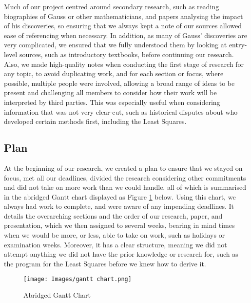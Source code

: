 \documentclass{article}
\begin{document}
Much of our project centred around secondary research, such as reading biographies of Gauss or other mathematicians, and papers analysing the impact of his discoveries, so ensuring that we always kept a note of our sources allowed ease of referencing when necessary. In addition, as many of Gauss’ discoveries are very complicated, we ensured that we fully understood them by looking at entry-level sources, such as introductory textbooks, before continuing our research. Also, we made high-quality notes when conducting the first stage of research for any topic, to avoid duplicating work, and for each section or focus, where possible, multiple people were involved, allowing a broad range of ideas to be present and challenging all members to consider how their work will be interpreted by third parties. This was especially useful when considering information that was not very clear-cut, such as historical disputes about who developed certain methods first, including the Least Squares. 

\subsection{Plan}
At the beginning of our research, we created a plan to ensure that we stayed on focus, met all our deadlines, divided the research considering other commitments and did not take on more work than we could handle, all of which is summarised in the abridged Gantt chart displayed as Figure \ref{ganttchart} below. Using this chart, we always had work to complete, and were aware of any impending deadlines. It details the overarching sections and the order of our research, paper, and presentation, which we then assigned to several weeks, bearing in mind times when we would be more, or less, able to take on work, such as holidays or examination weeks. Moreover, it has a clear structure, meaning we did not attempt anything we did not have the prior knowledge or research for, such as the program for the Least Squares before we knew how to derive it. 

\begin{figure}[H]
\centering
  \texttt{[image: Images/gantt chart.png]}
  \caption{Abridged Gantt Chart}
  \label{ganttchart}
\end{figure}
\end{document}

